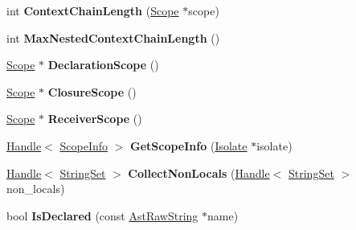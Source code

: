 \begin{DoxyCompactItemize}
\item 
int {\bfseries Context\+Chain\+Length} (\hyperlink{classv8_1_1internal_1_1_scope}{Scope} $\ast$scope)\hypertarget{classv8_1_1internal_1_1_scope_a529511c688fa9164e09a39ef9dc65e67}{}\label{classv8_1_1internal_1_1_scope_a529511c688fa9164e09a39ef9dc65e67}

\item 
int {\bfseries Max\+Nested\+Context\+Chain\+Length} ()\hypertarget{classv8_1_1internal_1_1_scope_ae43d4dd2c678c41fa21559c26d1fb9f8}{}\label{classv8_1_1internal_1_1_scope_ae43d4dd2c678c41fa21559c26d1fb9f8}

\item 
\hyperlink{classv8_1_1internal_1_1_scope}{Scope} $\ast$ {\bfseries Declaration\+Scope} ()\hypertarget{classv8_1_1internal_1_1_scope_aa39f7b4d3208196486b1e535228ab2a2}{}\label{classv8_1_1internal_1_1_scope_aa39f7b4d3208196486b1e535228ab2a2}

\item 
\hyperlink{classv8_1_1internal_1_1_scope}{Scope} $\ast$ {\bfseries Closure\+Scope} ()\hypertarget{classv8_1_1internal_1_1_scope_a38d69189f17253fab7d087e995cb12e2}{}\label{classv8_1_1internal_1_1_scope_a38d69189f17253fab7d087e995cb12e2}

\item 
\hyperlink{classv8_1_1internal_1_1_scope}{Scope} $\ast$ {\bfseries Receiver\+Scope} ()\hypertarget{classv8_1_1internal_1_1_scope_abfdec644dc631508dc47c420e30a8d45}{}\label{classv8_1_1internal_1_1_scope_abfdec644dc631508dc47c420e30a8d45}

\item 
\hyperlink{classv8_1_1internal_1_1_handle}{Handle}$<$ \hyperlink{classv8_1_1internal_1_1_scope_info}{Scope\+Info} $>$ {\bfseries Get\+Scope\+Info} (\hyperlink{classv8_1_1internal_1_1_isolate}{Isolate} $\ast$isolate)\hypertarget{classv8_1_1internal_1_1_scope_a06cf3e570933e0b2b668258cfdca3961}{}\label{classv8_1_1internal_1_1_scope_a06cf3e570933e0b2b668258cfdca3961}

\item 
\hyperlink{classv8_1_1internal_1_1_handle}{Handle}$<$ \hyperlink{classv8_1_1internal_1_1_string_set}{String\+Set} $>$ {\bfseries Collect\+Non\+Locals} (\hyperlink{classv8_1_1internal_1_1_handle}{Handle}$<$ \hyperlink{classv8_1_1internal_1_1_string_set}{String\+Set} $>$ non\+\_\+locals)\hypertarget{classv8_1_1internal_1_1_scope_a7ce2a0cf001ebd76da26825fa2969b17}{}\label{classv8_1_1internal_1_1_scope_a7ce2a0cf001ebd76da26825fa2969b17}

\item 
bool {\bfseries Is\+Declared} (const \hyperlink{classv8_1_1internal_1_1_ast_raw_string}{Ast\+Raw\+String} $\ast$name)\hypertarget{classv8_1_1internal_1_1_scope_a99973033fe4c8e41f85b7ffbccf00aef}{}\label{classv8_1_1internal_1_1_scope_a99973033fe4c8e41f85b7ffbccf00aef}


\end{DoxyCompactItemize}
